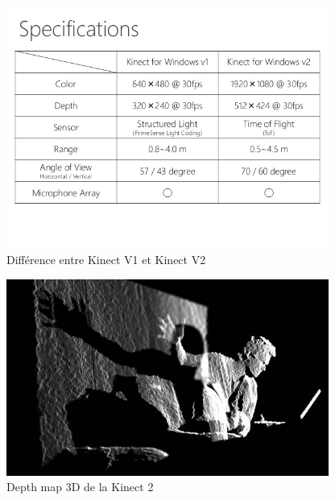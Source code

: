 \begin{figure}[H]
  \begin{center}
    \includegraphics[width=400px]{images/kinect-v2-introduction-and-tutorial-8-638.jpg}
    \caption{Différence entre Kinect V1 et Kinect V2}
    \label{fig:kinect1vs2}
  \end{center}
\end{figure}

\begin{figure}[H]
  \begin{center}
    \includegraphics[width=400px]{images/kyle_kinect.jpg}
    \caption{Depth map 3D de la Kinect 2}
  \end{center}
\end{figure}

